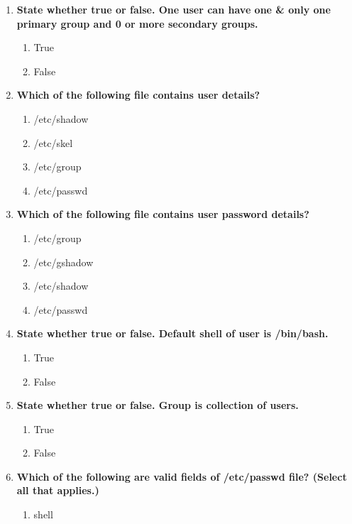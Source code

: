 \begin{flushleft}
	\begin{enumerate}
		\item \textbf{State whether true or false. One user can have one \& only one primary group and 0 or more secondary groups.}
		\begin{enumerate}[label=(\alph*)]
			\item True %
			\item False
		\end{enumerate}
		\bigskip
		\bigskip
		\item \textbf{Which of the following file contains user details?}
		\begin{enumerate}[label=(\alph*)]
			\item /etc/shadow
			\item /etc/skel
			\item /etc/group
			\item /etc/passwd %
		\end{enumerate}
		\bigskip
		\bigskip
		\item \textbf{Which of the following file contains user password details?}
		\begin{enumerate}[label=(\alph*)]
			\item /etc/group
			\item /etc/gshadow
			\item /etc/shadow  %
			\item /etc/passwd
		\end{enumerate}
		\bigskip
		\bigskip
		\item \textbf{State whether true or false. Default shell of user is /bin/bash.}
		\begin{enumerate}[label=(\alph*)]
			\item True  %
			\item False
		\end{enumerate}
		\bigskip
		\bigskip
		\item \textbf{State whether true or false. Group is collection of users.}
		\begin{enumerate}[label=(\alph*)]
			\item True  %
			\item False
		\end{enumerate}
		\bigskip
		\bigskip
		\item \textbf{Which of the following are valid fields of /etc/passwd file? (Select all that applies.)}
		\begin{enumerate}[label=(\alph*)]
			\item shell                  %

\end{enumerate}
\end{enumerate}
\end{flushleft}
